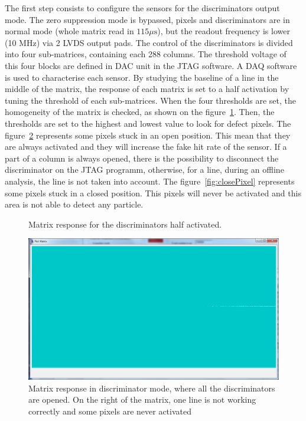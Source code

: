   The first step consists to configure the sensors for the discriminators output mode.
  The zero suppression mode is bypassed, pixels and discriminators are in normal mode (whole matrix read in $115\mu\text{s}$), but the readout frequency is lower (10 MHz) via 2 LVDS output pads.
  The control of the discriminators is divided into four sub-matrices, containing each 288 columns.
  The threshold voltage of this four blocks are defined in DAC unit in the JTAG software.
  A DAQ software is used to characterise each sensor. 
  By studying the baseline of a line in the middle of the matrix, the response of each matrix is set to a half activation by tuning the threshold of each sub-matrices.
  When the four thresholds are set, the homogeneity of the matrix is checked, as shown on the figure~\ref{fig:homogeneityMi26}.
  Then, the thresholds are set to the highest and lowest value to look for defect pixels.
  The figure~\ref{fig:openPixel} represents some pixels stuck in an open position.
  This mean that they are always activated and they will increase the fake hit rate of the sensor.
  If a part of a column is always opened, there is the possibility to disconnect the discriminator on the JTAG programm, otherwise, for a line, during an offline analysis, the line is not taken into account.
  The figure~\ref{fig:closePixel} represents some pixels stuck in a closed position.
  This pixels will never be activated and this area is not able to detect any particle.

  \begin{figure}[!h]
    \caption{Matrix response for the discriminators half activated.}
    \label{fig:homogeneityMi26}
  \end{figure}

  \begin{figure}[!h]
    \centering
    \includegraphics[width=\textwidth]{Pictures/labTests/th0.png}
    \caption{Matrix response in discriminator mode, where all the discriminators are opened. On the right of the matrix, one line is not working correctly and some pixels are never activated}
    \label{fig:openPixel}
  \end{figure}
  
